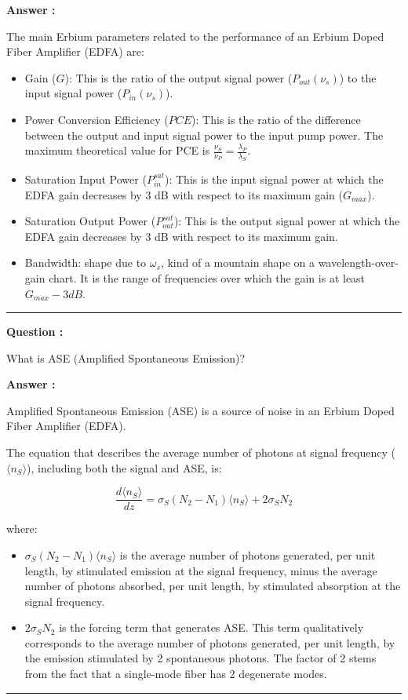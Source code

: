 \documentclass[a4paper,11pt]{book}
\newcounter{qacount}
\newenvironment{question}{
  \refstepcounter{qacount}
  \vspace{1em} %
  \noindent\textbf{Question \theqacount:}\space
}{
  \par %
}
\newenvironment{answer}{
  \noindent\textbf{Answer \theqacount:}\space
}{
  \par\vspace{1em}   %
  \hrule             %
  \vspace{0.5em}     %
}
\begin{document}
\begin{answer}
    The main Erbium parameters related to the performance of an Erbium Doped Fiber Amplifier (EDFA) are:
    \begin{itemize}
        \item Gain ($G$): This is the ratio of the output signal power ($P_{out}(\nu_s)$) to the input signal power ($P_{in}(\nu_s)$).
        \item Power Conversion Efficiency ($PCE$): This is the ratio of the difference between the output and input signal power to the input pump power. The maximum theoretical value for PCE is $\frac{\nu_S}{\nu_P} = \frac{\lambda_P}{\lambda_S}$.
        \item Saturation Input Power ($P_{in}^{sat}$): This is the input signal power at which the EDFA gain decreases by 3 dB with respect to its maximum gain ($G_{max}$).
        \item Saturation Output Power ($P_{out}^{sat}$): This is the output signal power at which the EDFA gain decreases by 3 dB with respect to its maximum gain.
        \item Bandwidth: shape due to $\omega_s$, kind of a mountain shape on a wavelength-over-gain chart. It is the range of frequencies over which the gain is at least $G_{max} - 3 dB$.
    \end{itemize}
\end{answer}

\begin{question}
    What is ASE (Amplified Spontaneous Emission)?
\end{question}

\begin{answer}
    Amplified Spontaneous Emission (ASE) is a source of noise in an Erbium Doped Fiber Amplifier (EDFA).

    The equation that describes the average number of photons at signal frequency ($\langle n_S \rangle$), including both the signal and ASE, is:

    $$\frac{d\langle n_S\rangle}{dz}=\sigma_S(N_2-N_1)\langle n_S\rangle+2\sigma_S N_2$$

    where:
    \begin{itemize}
        \item $\sigma_S(N_2-N_1)\langle n_S\rangle$ is the average number of photons generated, per unit length, by stimulated emission at the signal frequency, minus the average number of photons absorbed, per unit length, by stimulated absorption at the signal frequency.
        \item $2\sigma_S N_2$ is the forcing term that generates ASE. This term qualitatively corresponds to the average number of photons generated, per unit length, by the emission stimulated by 2 spontaneous photons. The factor of 2 stems from the fact that a single-mode fiber has 2 degenerate modes.
    \end{itemize}
\end{answer}
\end{document}
